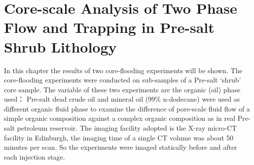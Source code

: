 \chapter{Core-scale Analysis of Two Phase Flow and Trapping in Pre-salt Shrub Lithology}
In this chapter the results of two core-flooding experiments will be shown. The core-flooding experiments were conducted on sub-samples of a Pre-salt ‘shrub’ core sample. The variable of these two experiments are the organic (oil) phase used： Pre-salt dead crude oil and mineral oil (99\% n-dodecane) were used as different organic fluid phase to examine the difference of pore-scale fluid flow of a simple organic composition against a complex organic composition as in real Pre-salt petroleum reservoir. The imaging facility adopted is the X-ray micro-CT facility in Edinburgh, the imaging time of a single CT volume was about 50 minutes per scan. So the experiments were imaged statically before and after each injection stage. 


